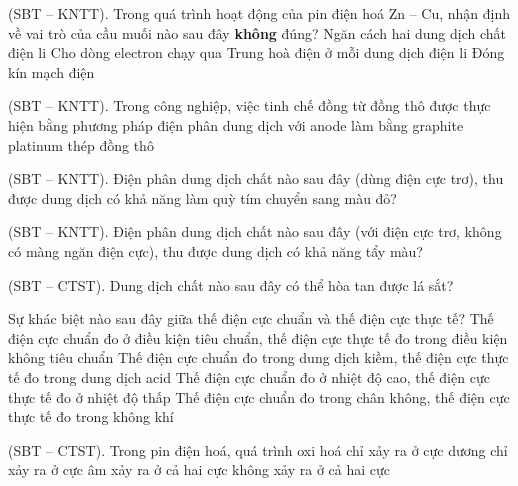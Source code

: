 \documentclass[11pt,a4paper]{article}
\def\loigiai#1{}
\begin{document}
\begin{ex}
(SBT – KNTT). Trong quá trình hoạt động của pin điện hoá Zn -- Cu, nhận định về vai trò của cầu muối nào sau đây \textbf{không} đúng?
\choice
{Ngăn cách hai dung dịch chất điện li}
{Cho dòng electron chạy qua}
{Trung hoà điện ở mỗi dung dịch điện li}
{Đóng kín mạch điện}
\loigiai{}
\end{ex}

\begin{ex}
(SBT – KNTT). Trong công nghiệp, việc tinh chế đồng từ đồng thô được thực hiện bằng phương pháp điện phân dung dịch với anode làm bằng
\choice
{graphite}
{platinum}
{thép}
{đồng thô}
\loigiai{}
\end{ex}

\begin{ex}
(SBT – KNTT). Điện phân dung dịch chất nào sau đây (dùng điện cực trơ), thu được dung dịch có khả năng làm quỳ tím chuyển sang màu đỏ?
\choice
{}
{}
{}
{}
\loigiai{}
\end{ex}

\begin{ex}
(SBT – KNTT). Điện phân dung dịch chất nào sau đây (với điện cực trơ, không có màng ngăn điện cực), thu được dung dịch có khả năng tẩy màu?
\choice
{}
{}
{}
{}
\loigiai{}
\end{ex}

\begin{ex}
(SBT – CTST). Dung dịch chất nào sau đây có thể hòa tan được lá sắt?
\choice
{}
{}
{}
{}
\loigiai{}
\end{ex}

\begin{ex}
Sự khác biệt nào sau đây giữa thế điện cực chuẩn và thế điện cực thực tế?
\choice
{Thế điện cực chuẩn đo ở điều kiện tiêu chuẩn, thế điện cực thực tế đo trong điều kiện không tiêu chuẩn}
{Thế điện cực chuẩn đo trong dung dịch kiềm, thế điện cực thực tế đo trong dung dịch acid}
{Thế điện cực chuẩn đo ở nhiệt độ cao, thế điện cực thực tế đo ở nhiệt độ thấp}
{Thế điện cực chuẩn đo trong chân không, thế điện cực thực tế đo trong không khí}
\loigiai{}
\end{ex}

\begin{ex}
(SBT – CTST). Trong pin điện hoá, quá trình oxi hoá
\choice
{chỉ xảy ra ở cực dương}
{chỉ xảy ra ở cực âm}
{xảy ra ở cả hai cực}
{không xảy ra ở cả hai cực}
\loigiai{}
\end{ex}
\end{document}
